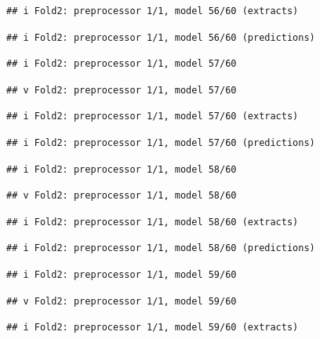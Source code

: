 \documentclass[
]{article}
\begin{document}
\begin{verbatim}
## i Fold2: preprocessor 1/1, model 56/60 (extracts)
\end{verbatim}

\begin{verbatim}
## i Fold2: preprocessor 1/1, model 56/60 (predictions)
\end{verbatim}

\begin{verbatim}
## i Fold2: preprocessor 1/1, model 57/60
\end{verbatim}

\begin{verbatim}
## v Fold2: preprocessor 1/1, model 57/60
\end{verbatim}

\begin{verbatim}
## i Fold2: preprocessor 1/1, model 57/60 (extracts)
\end{verbatim}

\begin{verbatim}
## i Fold2: preprocessor 1/1, model 57/60 (predictions)
\end{verbatim}

\begin{verbatim}
## i Fold2: preprocessor 1/1, model 58/60
\end{verbatim}

\begin{verbatim}
## v Fold2: preprocessor 1/1, model 58/60
\end{verbatim}

\begin{verbatim}
## i Fold2: preprocessor 1/1, model 58/60 (extracts)
\end{verbatim}

\begin{verbatim}
## i Fold2: preprocessor 1/1, model 58/60 (predictions)
\end{verbatim}

\begin{verbatim}
## i Fold2: preprocessor 1/1, model 59/60
\end{verbatim}

\begin{verbatim}
## v Fold2: preprocessor 1/1, model 59/60
\end{verbatim}

\begin{verbatim}
## i Fold2: preprocessor 1/1, model 59/60 (extracts)
\end{verbatim}
\end{document}
